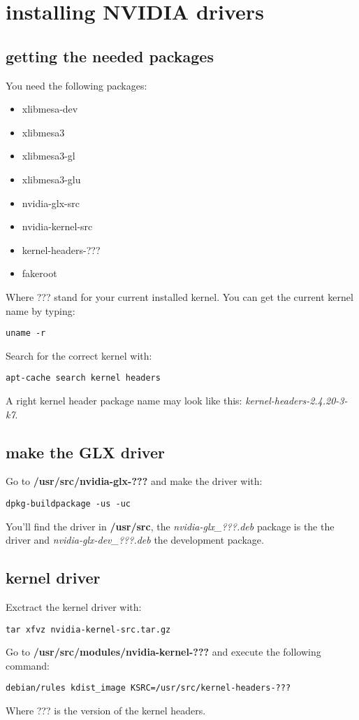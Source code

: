 \section{installing NVIDIA drivers}
\subsection{getting the needed packages}
You need the following packages:
\begin{itemize}
\item xlibmesa-dev
\item xlibmesa3
\item xlibmesa3-gl
\item xlibmesa3-glu
\item nvidia-glx-src
\item nvidia-kernel-src
\item kernel-headers-???
\item fakeroot
\end{itemize}
Where ??? stand for your current installed kernel. You can get the current kernel name by typing:\\
\begin{verbatim}
uname -r
\end{verbatim}
Search for the correct kernel with:\\
\begin{verbatim}
apt-cache search kernel headers
\end{verbatim}
A right kernel header package name may look like this: \textit{kernel-headers-2.4.20-3-k7}.
\subsection{make the GLX driver}
Go to \textbf{/usr/src/nvidia-glx-???} and make the driver with:
\begin{verbatim}
dpkg-buildpackage -us -uc
\end{verbatim}
You'll find the driver in \textbf{/usr/src}, the \textit{nvidia-glx_???.deb} package is the the driver and  \textit{nvidia-glx-dev_???.deb} the development package.

\subsection{kernel driver}
Exctract the kernel driver with:\\
\begin{verbatim}
tar xfvz nvidia-kernel-src.tar.gz
\end{verbatim}
Go to \textbf{/usr/src/modules/nvidia-kernel-???} and execute the following command:
\begin{verbatim}
debian/rules kdist_image KSRC=/usr/src/kernel-headers-???
\end{verbatim}
Where ??? is the version of the kernel headers.